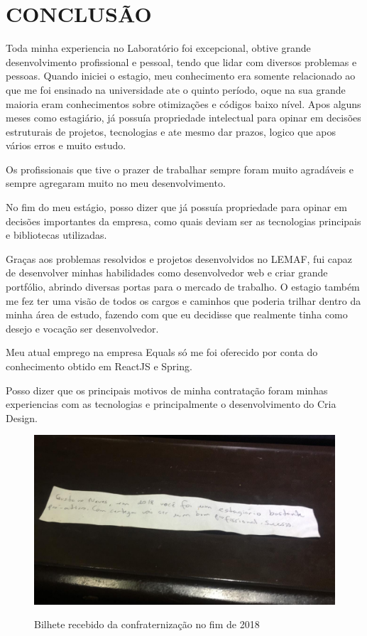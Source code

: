 \chapter{CONCLUSÃO}
\label{cap:conclusao}

Toda minha experiencia no Laboratório foi excepcional, obtive grande desenvolvimento profissional e pessoal, tendo que lidar com diversos problemas e pessoas.
Quando iniciei o estagio, meu conhecimento era somente relacionado ao que me foi ensinado na universidade ate o quinto período, oque na sua grande maioria eram conhecimentos sobre otimizações e códigos baixo nível.
Apos alguns meses como estagiário, já possuía propriedade intelectual para opinar em decisões estruturais de projetos, tecnologias e ate mesmo dar prazos, logico que apos vários erros e muito estudo.
 
Os profissionais que tive o prazer de trabalhar sempre foram muito agradáveis e sempre agregaram muito no meu desenvolvimento.

No fim do meu estágio, posso dizer que já possuía propriedade para opinar em decisões importantes da empresa, como quais deviam ser as tecnologias principais e bibliotecas utilizadas.

Graças aos problemas resolvidos e projetos desenvolvidos no LEMAF, fui capaz de desenvolver minhas habilidades como desenvolvedor web e criar grande portfólio, abrindo diversas portas para o mercado de trabalho.
O estagio também me fez ter uma visão de todos os cargos e caminhos que poderia trilhar dentro da minha área de estudo, fazendo com que eu decidisse que realmente tinha como desejo e vocação ser desenvolvedor.

Meu atual emprego na empresa Equals só me foi oferecido por conta do conhecimento obtido em ReactJS e Spring. 

Posso dizer que os principais motivos de minha contratação foram minhas experiencias com as tecnologias e principalmente o desenvolvimento do Cria Design.

\begin{figure}[H]
\centering
\caption{Bilhete recebido da confraternização no fim de 2018} %
\includegraphics[scale=0.3]{agradecimento}\\  %
\label{fig:exemplo} %
\end{figure}
